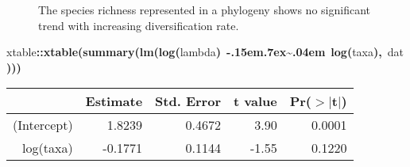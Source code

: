 \documentclass[authoryear, preprint]{elsarticle}
\makeatletter
\newcommand{\hlfunctioncall}[1]{\textcolor[rgb]{.5,0,.33}{\textbf{#1}}}%
\newcommand{\hlkeyword}[1]{\textbf{#1}}%
\newcommand{\hlpackage}[1]{\textcolor[rgb]{.59,.71,.145}{#1}}%
\newcommand{\hlsymbol}[1]{#1}%
\def\urltilda{\kern -.15em\lower .7ex\hbox{\~{}}\kern .04em}%
\newenvironment{kframe}{%
 \def\FrameCommand##1{\hskip\@totalleftmargin \hskip-\fboxsep
 \colorbox{shadecolor}{##1}\hskip-\fboxsep
     \hskip-\linewidth \hskip-\@totalleftmargin \hskip\columnwidth}%
 \MakeFramed {\advance\hsize-\width
   \@totalleftmargin\z@ \linewidth\hsize
   \@setminipage}}%
 {\par\unskip\endMakeFramed}
\newenvironment{knitrout}{}{} %
\makeatother
\begin{document}
\begin{figure}
\begin{center}
  \caption{The species richness represented in a phylogeny shows no significant trend with increasing diversification rate. }\label{lambda_ntaxa}
  \end{center}
\end{figure}

\begin{knitrout}
\color{fgcolor}\begin{kframe}
\begin{flushleft}
\ttfamily\noindent
\hlpackage{xtable}\hlkeyword{::}\hlfunctioncall{xtable}\hlkeyword{(}\hlfunctioncall{summary}\hlkeyword{(}\hlfunctioncall{lm}\hlkeyword{(}\hlfunctioncall{log}\hlkeyword{(}\hlsymbol{lambda}\hlkeyword{)}{\ }\hlkeyword{\urltilda{}}{\ }\hlfunctioncall{log}\hlkeyword{(}\hlsymbol{taxa}\hlkeyword{)}\hlkeyword{,}{\ }\hlsymbol{dat}\hlkeyword{)}\hlkeyword{)}\hlkeyword{)}\mbox{}
\normalfont
\end{flushleft}
\end{kframe}\begin{table}[ht]
\begin{center}
\begin{tabular}{rrrrr}
  \hline
 & Estimate & Std. Error & t value & Pr($>$$|$t$|$) \\ 
  \hline
(Intercept) & 1.8239 & 0.4672 & 3.90 & 0.0001 \\ 
  log(taxa) & -0.1771 & 0.1144 & -1.55 & 0.1220 \\ 
   \hline
\end{tabular}
\end{center}
\end{table}\color{fgcolor}
\end{knitrout}
\end{document}
